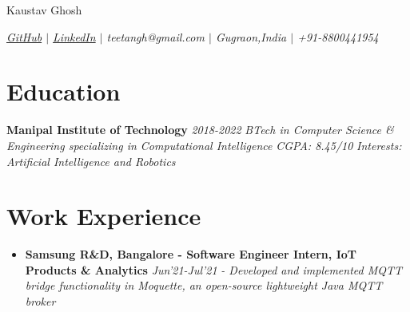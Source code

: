 \documentclass{article}
\makeatletter
\renewcommand{\maketitle}{
    \begin{flushleft}        
        {\huge\rmfamily
        \theauthor}\newline
        \vspace{0.1em}
        \textit{teetangh@gmail.com -- github.com/teetangh}\newline
        \textit{Contact No. -- +91-8800441954}\newline
        \textit{Manipal Institute of Technology}\newline
        \textit{B.Tech in \textbf{Computer Science \& Engineering}}
        \textit{2018 - 2022}\newline
        \textit{Minor in \textbf{Computational Intelligence}}\newline
        \textit{CGPA: 8.45/10}\newline
    \end{flushleft}

}
\makeatother
\begin{document}
\thispagestyle{empty}  %


\begin{center}
    \huge{Kaustav Ghosh}

    \normalsize{
        \textit{
            \href{https://www.github.com/teetangh}{GitHub} \(|\)
            \href{https://www.linkedin.com/in/kaustav-ghosh-1538651bb/}{LinkedIn} \(|\)
            teetangh@gmail.com \(|\)
            Gugraon,India \(|\)
            +91-8800441954
        }}
\end{center}

\section*{Education}

\textbf{Manipal Institute of Technology} \hfill \textit{2018-2022}
\textmd{\newline \textit{BTech in Computer Science \& Engineering specializing in Computational Intelligence}} \hfill \textit{CGPA: 8.45/10}
\textmd{\newline \textit{Interests: Artificial Intelligence and Robotics}}


\section*{Work Experience}

\begin{itemize}
    \item{\textbf{\large{Samsung R\&D, Bangalore - Software Engineer Intern, IoT Products \& Analytics}}} \hfill \textit{Jun'21-Jul'21}
          \newline
          \textit{- Developed and implemented MQTT bridge functionality in Moquette, an open-source lightweight Java MQTT broker}
\end{itemize}
\end{document}
